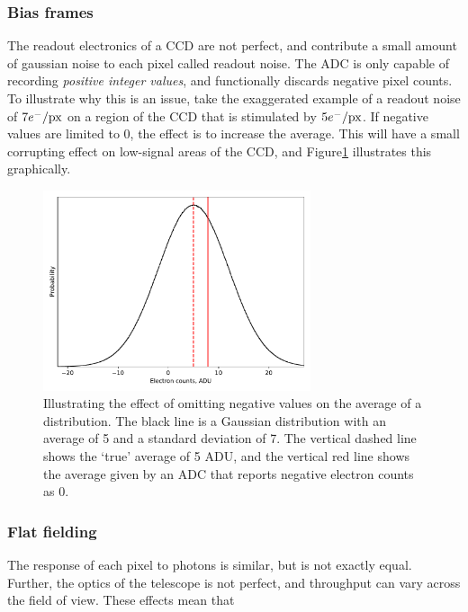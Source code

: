 \subsubsection{Bias frames}
The readout electronics of a CCD are not perfect, and contribute a small amount of gaussian noise to each pixel called readout noise. The ADC is only capable of recording {\it positive integer values}, and functionally discards negative pixel counts. To illustrate why this is an issue, take the exaggerated example of a readout noise of $7 e^-/{\rm px}$ on a region of the CCD that is stimulated by $5 e^-/{\rm px}$. If negative values are limited to 0, the effect is to increase the average. This will have a small corrupting effect on low-signal areas of the CCD, and Figure\ref{fig:observations:bias frame histogram} illustrates this graphically.
\begin{figure}
    \centering
    \includegraphics[width=0.7\textwidth]{figures/observations/bias_frame_histogram.pdf}
    \caption{Illustrating the effect of omitting negative values on the average of a distribution. The black line is a Gaussian distribution with an average of 5 and a standard deviation of 7. The vertical dashed line shows the `true' average of 5 ADU, and the vertical red line shows the average given by an ADC that reports negative electron counts as 0.}
    \label{fig:observations:bias frame histogram}
\end{figure}

\subsubsection{Flat fielding}
The response of each pixel to photons is similar, but is not exactly equal. Further, the optics of the telescope is not perfect, and throughput can vary across the field of view. These effects mean that 

